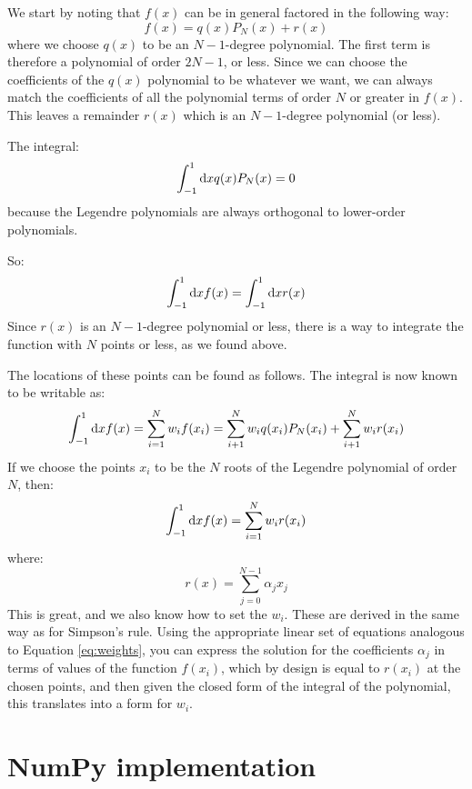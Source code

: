We start by noting that $f(x)$  can be in general factored in the
following way:
\begin{equation}
f(x) = q(x) P_N(x) + r(x)
\end{equation}
where we choose $q(x)$ to be an $N-1$-degree polynomial. The first
term is therefore a polynomial of order $2N-1$, or less. Since we can
choose the coefficients of the $q(x)$ polynomial to be whatever we
want, we can always match the coefficients of all the polynomial terms
of order $N$ or greater in $f(x)$. This leaves a remainder $r(x)$
which is an $N-1$-degree polynomial (or less).

The integral:
\begin{equation}
\int_{-1}^{1} {\rm d}x q(x) P_N(x) = 0
\end{equation}
because the Legendre polynomials are always orthogonal to lower-order
polynomials.

So:
\begin{equation}
\int_{-1}^{1} {\rm d}x f(x) = \int_{-1}^{1} {\rm d}x r(x)
\end{equation}
Since $r(x)$ is an $N-1$-degree polynomial or less, there is a way to
integrate the function with $N$ points or less, as we found above.

The locations of these points can be found as follows. The integral is
now known to be writable as:
\begin{equation}
\int_{-1}^{1} {\rm d}x f(x) = \sum_{i=1}^{N} w_i f(x_i) =
\sum_{i+1}^{N} w_i q(x_i) P_N(x_i) + 
\sum_{i+1}^{N} w_i r(x_i)
\end{equation}
If we choose the points $x_i$ to be the $N$ roots of the Legendre
polynomial of order $N$, then:
\begin{equation}
\int_{-1}^{1} {\rm d}x f(x) = \sum_{i=1}^{N} w_i r(x_i)
\end{equation}
where:
\begin{equation}
r(x) = \sum_{j=0}^{N-1} \alpha_j x_j
\end{equation}
This is great, and we also know how to set the $w_i$. These are
derived in the same way as for Simpson's rule.  Using the appropriate
linear set of equations analogous to Equation \ref{eq:weights}, you
can express the solution for the coefficients $\alpha_j$ in terms of
values of the function $f(x_i)$, which by design is equal to $r(x_i)$
at the chosen points, and then given the closed form of the integral
of the polynomial, this translates into a form for $w_i$.



\section{NumPy implementation}

